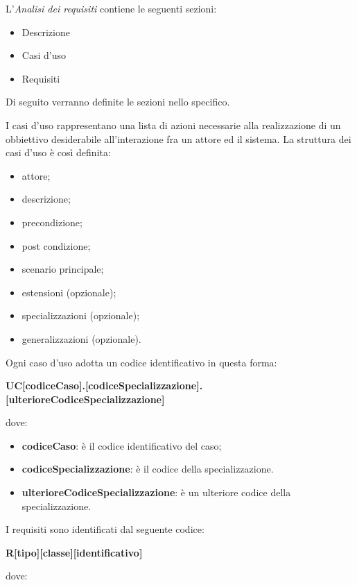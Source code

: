 		
		L'\textit{Analisi dei requisiti} contiene le seguenti sezioni:
		\begin{itemize}
			\item Descrizione
			\item Casi d'uso
			\item Requisiti
		\end{itemize}
		Di seguito verranno definite le sezioni nello specifico.
		
		
		I casi d'uso rappresentano una lista di azioni necessarie alla realizzazione di un obbiettivo desiderabile all'interazione fra un attore ed il sistema.
		La struttura dei casi d'uso è così definita:
		\begin{itemize}
		    \item attore;
		    \item descrizione;
		    \item precondizione;
		    \item post condizione;
		    \item scenario principale;
		    \item estensioni (opzionale);
		    \item specializzazioni (opzionale);
		    \item generalizzazioni (opzionale).
		\end{itemize}
		Ogni caso d'uso adotta un codice identificativo in questa forma:\\
	    \centerline{\textbf{UC[codiceCaso].[codiceSpecializzazione].[ulterioreCodiceSpecializzazione]}}
        dove:
	    \begin{itemize}
	        \item \textbf{codiceCaso}: è il codice identificativo del caso;
	        \item \textbf{codiceSpecializzazione}: è il codice della specializzazione.
	        \item \textbf{ulterioreCodiceSpecializzazione}: è un ulteriore codice della specializzazione.
	    \end{itemize}
	    I requisiti sono identificati dal seguente codice:\\
	    \centerline{\textbf{R[tipo][classe][identificativo]}}
	    dove:
